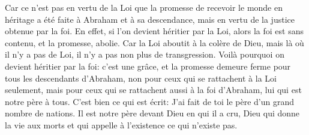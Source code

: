 Car ce n’est pas en vertu de la Loi
		que la promesse de recevoir le monde en héritage
		a été faite à Abraham et à sa descendance,
	mais en vertu de la justice obtenue par la foi.
En effet, si l’on devient héritier par la Loi,
	alors la foi est sans contenu, et la promesse, abolie.
Car la Loi aboutit à la colère de Dieu,
	mais là où il n’y a pas de Loi, il n’y a pas non plus de transgression.
Voilà pourquoi on devient héritier par la foi:
	c’est une grâce,
	et la promesse demeure ferme pour tous les descendants d’Abraham,
	non pour ceux qui se rattachent à la Loi seulement,
	mais pour ceux qui se rattachent aussi à la foi d’Abraham,
	lui qui est notre père à tous.
C’est bien ce qui est écrit:
	J’ai fait de toi le père d’un grand nombre de nations.
Il est notre père devant Dieu en qui il a cru,
	Dieu qui donne la vie aux morts
	et qui appelle à l’existence ce qui n’existe pas.
